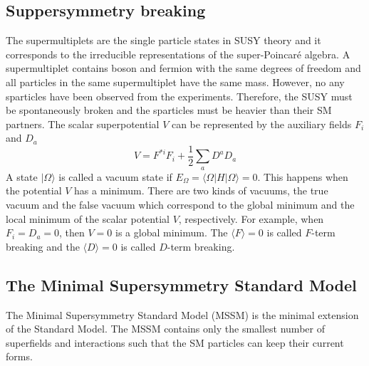 
\subsection{Suppersymmetry breaking}
\label{sybsec:susy_soft_susy_breaking}
The supermultiplets are the single particle states in SUSY theory and it corresponds to the irreducible representations of the super-Poincar\'{e} algebra.
A supermultiplet contains boson and fermion with the same degrees of freedom and all particles in the same supermultiplet have the same mass.
However, no any sparticles have been observed from the experiments.
Therefore, the SUSY must be spontaneously broken and the sparticles must be heavier than their SM partners.
The scalar superpotential $V$ can be represented by the auxiliary fields $F_{i}$ and $D_{a}$
%
\begin{equation}
    V = F^{*i}F_{i} + \frac{1}{2} \sum_{a} D^{a} D_{a}
    \label{eq:susy_scalar_superpotential}
\end{equation}
%
A state $|\Omega \rangle$ is called a vacuum state if $E_{\Omega} = \langle \Omega | H | \Omega \rangle = 0$.
This happens when the potential $V$ has a minimum.
There are two kinds of vacuums, the true vacuum and the false vacuum which correspond to the global minimum and the local minimum of the scalar potential $V$, respectively.
For example, when $F_{i} = D_{a} = 0$, then $V = 0$ is a global minimum.
The $\langle F \rangle = 0$ is called $F$-term breaking and the $\langle D \rangle = 0$ is called $D$-term breaking.


\subsection{The Minimal Supersymmetry Standard Model}
\label{subsec:susy_mssm}
The Minimal Supersymmetry Standard Model (MSSM) is the minimal extension of the Standard Model.
The MSSM contains only the smallest number of superfields and interactions such that the SM particles can keep their current forms.


